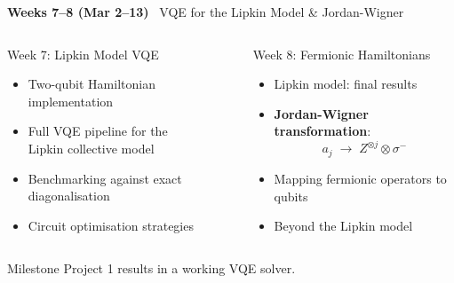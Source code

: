 \documentclass[aspectratio=169,12pt]{beamer}
\newcommand{\week}[1]{\textcolor{qgold}{\textbf{#1}}}
\begin{document}
\begin{frame}{\week{Weeks 7--8 (Mar 2--13)} \ VQE for the Lipkin Model \& Jordan-Wigner}
  \begin{columns}[T]
      \begin{block}{Week 7: Lipkin Model VQE}
        \begin{itemize}
          \item Two-qubit Hamiltonian implementation
          \item Full VQE pipeline for the\\
                Lipkin collective model
          \item Benchmarking against exact diagonalisation
          \item Circuit optimisation strategies
        \end{itemize}
      \end{block}
      \begin{block}{Week 8: Fermionic Hamiltonians}
        \begin{itemize}
          \item Lipkin model: final results
          \item \textbf{Jordan-Wigner transformation}:
                \[
                  a_j \;\rightarrow\; Z^{\otimes j}\otimes\sigma^-
                \]
          \item Mapping fermionic operators to qubits
          \item Beyond the Lipkin model
        \end{itemize}
      \end{block}
  \end{columns}
  \vspace{4pt}
  \begin{alertblock}{Milestone}
    Project 1 results in a working VQE solver.
  \end{alertblock}
\end{frame}
\end{document}
